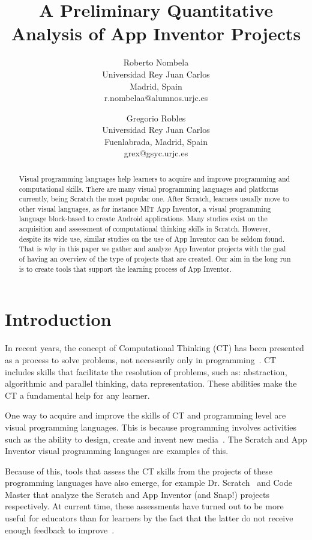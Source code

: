 \documentclass[a4paper]{article}
\title{A Preliminary Quantitative Analysis of App Inventor Projects}
\author{
Roberto Nombela \\ Universidad Rey Juan Carlos\\
                Madrid, Spain \\ r.nombelaa@alumnos.urjc.es
\and
Gregorio Robles \\Universidad Rey Juan Carlos \\
                Fuenlabrada, Madrid, Spain \\grex@gsyc.urjc.es
}
\begin{document}
\maketitle

\begin{abstract}
Visual programming languages help learners to acquire and improve programming and computational skills.
There are many visual programming languages and platforms currently, being Scratch the most popular one.
After Scratch, learners usually move to other visual languages, as for instance MIT App Inventor, a visual programming language block-based to create Android applications.
Many studies exist on the acquisition and assessment of computational thinking skills in Scratch.
However, despite its wide use, similar studies on the use of App Inventor can be seldom found.
That is why in this paper we gather and analyze App Inventor projects with the goal of having an overview of the type of projects that are created.
Our aim in the long run is to create tools that support the learning process of App Inventor.
\end{abstract}


\section{Introduction}
In recent years, the concept of Computational Thinking (CT) has been presented as a process to solve problems, not necessarily only in programming~\cite{wing2006computational}. 
CT includes skills that facilitate the resolution of problems, such as: abstraction, algorithmic and parallel thinking, data representation. These abilities make the CT a fundamental help for any learner.

One way to acquire and improve the skills of CT and programming level are visual programming languages.
This is because programming involves activities such as the ability to design, create and invent new media~\cite{resnick2009scratch}.
The Scratch and App Inventor visual programming languages are examples of this.

Because of this, tools that assess the CT skills from the projects of these programming languages have also emerge, for example Dr. Scratch~\cite{moreno2015dr} and Code Master that analyze the Scratch and App Inventor (and Snap!) projects respectively. 
At current time, these assessments have turned out to be more useful for educators than for learners by the fact that the latter do not receive enough feedback to improve~\cite{robles2018ontools}.
\end{document}
